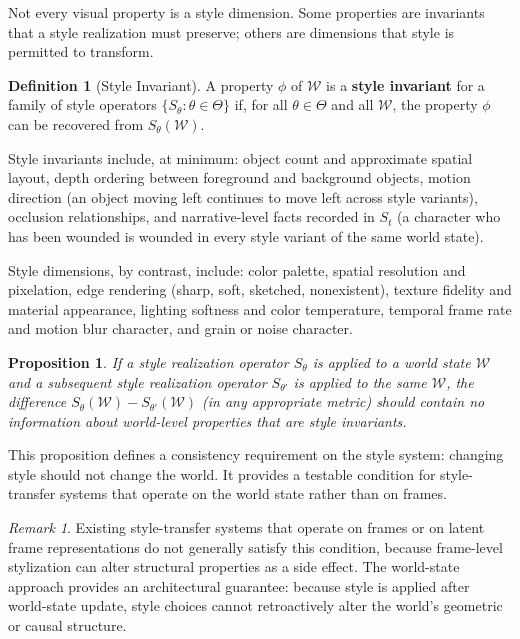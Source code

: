 \documentclass[11pt,a4paper]{article}
\theoremstyle{plain}
\newtheorem{proposition}[theorem]{Proposition}
\theoremstyle{definition}
\newtheorem{definition}[theorem]{Definition}
\theoremstyle{remark}
\newtheorem{remark}[theorem]{Remark}
\begin{document}
Not every visual property is a style dimension. Some properties are invariants that a style realization must preserve; others are dimensions that style is permitted to transform.

\begin{definition}[Style Invariant]
A property $\phi$ of $\mathcal{W}$ is a \textbf{style invariant} for a family of style operators $\{S_\theta : \theta \in \Theta\}$ if, for all $\theta \in \Theta$ and all $\mathcal{W}$, the property $\phi$ can be recovered from $S_\theta(\mathcal{W})$.
\end{definition}

Style invariants include, at minimum: object count and approximate spatial layout, depth ordering between foreground and background objects, motion direction (an object moving left continues to move left across style variants), occlusion relationships, and narrative-level facts recorded in $S_t$ (a character who has been wounded is wounded in every style variant of the same world state).

Style dimensions, by contrast, include: color palette, spatial resolution and pixelation, edge rendering (sharp, soft, sketched, nonexistent), texture fidelity and material appearance, lighting softness and color temperature, temporal frame rate and motion blur character, and grain or noise character.

\begin{proposition}
If a style realization operator $S_\theta$ is applied to a world state $\mathcal{W}$ and a subsequent style realization operator $S_{\theta'}$ is applied to the same $\mathcal{W}$, the difference $S_\theta(\mathcal{W}) - S_{\theta'}(\mathcal{W})$ (in any appropriate metric) should contain no information about world-level properties that are style invariants.
\end{proposition}

This proposition defines a consistency requirement on the style system: changing style should not change the world. It provides a testable condition for style-transfer systems that operate on the world state rather than on frames.

\begin{remark}
Existing style-transfer systems that operate on frames or on latent frame representations do not generally satisfy this condition, because frame-level stylization can alter structural properties as a side effect. The world-state approach provides an architectural guarantee: because style is applied after world-state update, style choices cannot retroactively alter the world's geometric or causal structure.
\end{remark}
\end{document}
